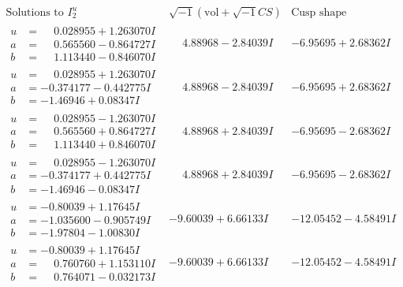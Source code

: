\documentclass[1p]{elsarticle_modified}
\theoremstyle{definition}
\newcommand{\I}{\sqrt{-1}}
\begin{document}
$$\begin{array}{c|c|c}  
\text{Solutions to }I^u_{2}& \I (\text{vol} + \sqrt{-1}CS) & \text{Cusp shape}\\
 \hline 
\begin{aligned}
u &= \phantom{-}0.028955 + 1.263070 I \\
a &= \phantom{-}0.565560 - 0.864727 I \\
b &= \phantom{-}1.113440 - 0.846070 I\end{aligned}
 & \phantom{-}4.88968 - 2.84039 I & -6.95695 + 2.68362 I \\ \hline\begin{aligned}
u &= \phantom{-}0.028955 + 1.263070 I \\
a &= -0.374177 - 0.442775 I \\
b &= -1.46946 + 0.08347 I\end{aligned}
 & \phantom{-}4.88968 - 2.84039 I & -6.95695 + 2.68362 I \\ \hline\begin{aligned}
u &= \phantom{-}0.028955 - 1.263070 I \\
a &= \phantom{-}0.565560 + 0.864727 I \\
b &= \phantom{-}1.113440 + 0.846070 I\end{aligned}
 & \phantom{-}4.88968 + 2.84039 I & -6.95695 - 2.68362 I \\ \hline\begin{aligned}
u &= \phantom{-}0.028955 - 1.263070 I \\
a &= -0.374177 + 0.442775 I \\
b &= -1.46946 - 0.08347 I\end{aligned}
 & \phantom{-}4.88968 + 2.84039 I & -6.95695 - 2.68362 I \\ \hline\begin{aligned}
u &= -0.80039 + 1.17645 I \\
a &= -1.035600 - 0.905749 I \\
b &= -1.97804 - 1.00830 I\end{aligned}
 & -9.60039 + 6.66133 I & -12.05452 - 4.58491 I \\ \hline\begin{aligned}
u &= -0.80039 + 1.17645 I \\
a &= \phantom{-}0.760760 + 1.153110 I \\
b &= \phantom{-}0.764071 - 0.032173 I\end{aligned}
 & -9.60039 + 6.66133 I & -12.05452 - 4.58491 I \\ \hline\begin{aligned}

\end{aligned}
\end{array}$$
\end{document}
